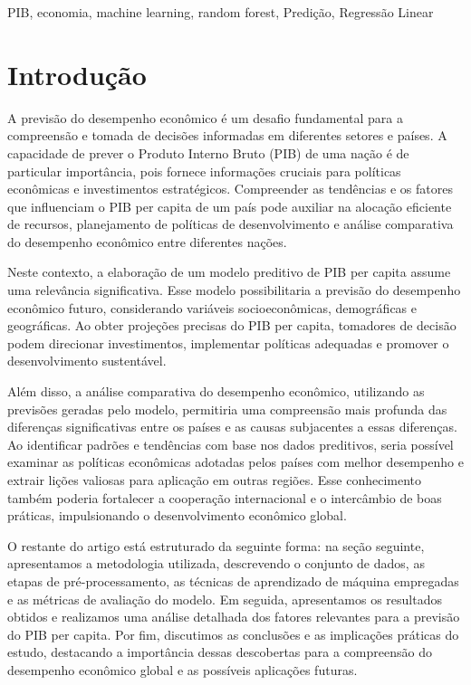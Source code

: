 \documentclass[conference]{IEEEtran}
\begin{document}
\renewcommand{\IEEEkeywordsname}{Palavras-chave}

\begin{IEEEkeywords}
  PIB, economia, machine learning, random forest, Predição, Regressão Linear
\end{IEEEkeywords}

\section{Introdução}
A previsão do desempenho econômico é um desafio fundamental para a compreensão e tomada de decisões informadas em diferentes setores e países. A capacidade de prever o Produto Interno Bruto (PIB) de uma nação é de particular importância, pois fornece informações cruciais para políticas econômicas e investimentos estratégicos. Compreender as tendências e os fatores que influenciam o PIB per capita de um país pode auxiliar na alocação eficiente de recursos, planejamento de políticas de desenvolvimento e análise comparativa do desempenho econômico entre diferentes nações.

Neste contexto, a elaboração de um modelo preditivo de PIB per capita assume uma relevância significativa. Esse modelo possibilitaria a previsão do desempenho econômico futuro, considerando variáveis socioeconômicas, demográficas e geográficas. Ao obter projeções precisas do PIB per capita, tomadores de decisão podem direcionar investimentos, implementar políticas adequadas e promover o desenvolvimento sustentável. 

Além disso, a análise comparativa do desempenho econômico, utilizando as previsões geradas pelo modelo, permitiria uma compreensão mais profunda das diferenças significativas entre os países e as causas subjacentes a essas diferenças. Ao identificar padrões e tendências com base nos dados preditivos, seria possível examinar as políticas econômicas adotadas pelos países com melhor desempenho e extrair lições valiosas para aplicação em outras regiões. Esse conhecimento também poderia fortalecer a cooperação internacional e o intercâmbio de boas práticas, impulsionando o desenvolvimento econômico global.

O restante do artigo está estruturado da seguinte forma: na seção seguinte, apresentamos a metodologia utilizada, descrevendo o conjunto de dados, as etapas de pré-processamento, as técnicas de aprendizado de máquina empregadas e as métricas de avaliação do modelo. Em seguida, apresentamos os resultados obtidos e realizamos uma análise detalhada dos fatores relevantes para a previsão do PIB per capita. Por fim, discutimos as conclusões e as implicações práticas do estudo, destacando a importância dessas descobertas para a compreensão do desempenho econômico global e as possíveis aplicações futuras.
\end{document}
